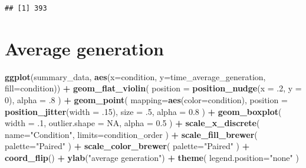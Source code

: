 \documentclass[]{book}
\newenvironment{Shaded}{\begin{snugshade}}{\end{snugshade}}
\newcommand{\DataTypeTok}[1]{\textcolor[rgb]{0.13,0.29,0.53}{#1}}
\newcommand{\DecValTok}[1]{\textcolor[rgb]{0.00,0.00,0.81}{#1}}
\newcommand{\FloatTok}[1]{\textcolor[rgb]{0.00,0.00,0.81}{#1}}
\newcommand{\KeywordTok}[1]{\textcolor[rgb]{0.13,0.29,0.53}{\textbf{#1}}}
\newcommand{\NormalTok}[1]{#1}
\newcommand{\OperatorTok}[1]{\textcolor[rgb]{0.81,0.36,0.00}{\textbf{#1}}}
\newcommand{\OtherTok}[1]{\textcolor[rgb]{0.56,0.35,0.01}{#1}}
\newcommand{\StringTok}[1]{\textcolor[rgb]{0.31,0.60,0.02}{#1}}
\begin{document}
\begin{verbatim}
## [1] 393
\end{verbatim}

\hypertarget{average-generation-1}{%
\section{Average generation}\label{average-generation-1}}

\begin{Shaded}
\begin{Highlighting}[]
\KeywordTok{ggplot}\NormalTok{(summary_data, }\KeywordTok{aes}\NormalTok{(}\DataTypeTok{x=}\NormalTok{condition, }\DataTypeTok{y=}\NormalTok{time_average_generation, }\DataTypeTok{fill=}\NormalTok{condition)) }\OperatorTok{+}
\StringTok{  }\KeywordTok{geom_flat_violin}\NormalTok{(}
    \DataTypeTok{position =} \KeywordTok{position_nudge}\NormalTok{(}\DataTypeTok{x =} \FloatTok{.2}\NormalTok{, }\DataTypeTok{y =} \DecValTok{0}\NormalTok{),}
    \DataTypeTok{alpha =} \FloatTok{.8}
\NormalTok{  ) }\OperatorTok{+}
\StringTok{  }\KeywordTok{geom_point}\NormalTok{(}
    \DataTypeTok{mapping=}\KeywordTok{aes}\NormalTok{(}\DataTypeTok{color=}\NormalTok{condition),}
    \DataTypeTok{position =} \KeywordTok{position_jitter}\NormalTok{(}\DataTypeTok{width =} \FloatTok{.15}\NormalTok{),}
    \DataTypeTok{size =} \FloatTok{.5}\NormalTok{,}
    \DataTypeTok{alpha =} \FloatTok{0.8}
\NormalTok{  ) }\OperatorTok{+}
\StringTok{  }\KeywordTok{geom_boxplot}\NormalTok{(}
    \DataTypeTok{width =} \FloatTok{.1}\NormalTok{,}
    \DataTypeTok{outlier.shape =} \OtherTok{NA}\NormalTok{,}
    \DataTypeTok{alpha =} \FloatTok{0.5}
\NormalTok{  ) }\OperatorTok{+}
\StringTok{  }\KeywordTok{scale_x_discrete}\NormalTok{(}
    \DataTypeTok{name=}\StringTok{"Condition"}\NormalTok{,}
    \DataTypeTok{limits=}\NormalTok{condition_order}
\NormalTok{  ) }\OperatorTok{+}
\StringTok{  }\KeywordTok{scale_fill_brewer}\NormalTok{(}
    \DataTypeTok{palette=}\StringTok{"Paired"}
\NormalTok{  ) }\OperatorTok{+}
\StringTok{  }\KeywordTok{scale_color_brewer}\NormalTok{(}
    \DataTypeTok{palette=}\StringTok{"Paired"}
\NormalTok{  ) }\OperatorTok{+}
\StringTok{  }\KeywordTok{coord_flip}\NormalTok{() }\OperatorTok{+}
\StringTok{  }\KeywordTok{ylab}\NormalTok{(}\StringTok{"average generation"}\NormalTok{) }\OperatorTok{+}
\StringTok{  }\KeywordTok{theme}\NormalTok{(}
    \DataTypeTok{legend.position=}\StringTok{"none"}
\NormalTok{  )}
\end{Highlighting}
\end{Shaded}
\end{document}
